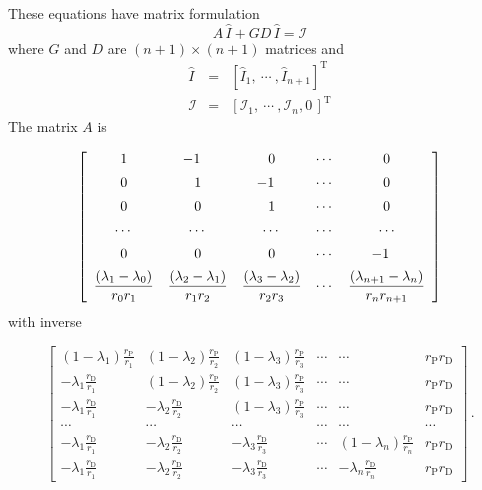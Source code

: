 \documentclass{slides}
\def\ds{\displaystyle}
\begin{document}
%
%
\begin{slide}
These equations have matrix formulation
\[
A\,\widehat{I}+GD\,\widehat{I}=\mathcal{I}
\]
where $G$ and $D$ are $(n+1)\times(n+1)$ matrices and
\[
\begin{array}{rcl}
\widehat{I} & = & [\widehat{I}_1,\ \cdots\ ,
\widehat{I}_{n+1}]^\mathrm{T}\\[10pt]
\mathcal{I} & = & [\mathcal{I}_1,\ \cdots\ ,
\mathcal{I}_n,0\,]^\mathrm{T}
\end{array}
\]
The matrix $A$ is

{
\tiny
\[
\left[\begin{array}{ccccc}
1 & \hskip-9pt-1 &  0 & \cdots & 0 \\[5pt]
0 &  1 & \hskip-9pt-1 & \cdots & 0 \\[5pt]
0 &  0 &  1 & \cdots & 0 \\[5pt]
\cdots & \cdots & \cdots & \cdots & \cdots \\[5pt]
0 & 0 & 0 & \cdots & \hskip-9pt-1 \\[5pt]
\ds\frac{(\lambda_1-\lambda_0)}{r_0 r_1} &
\ds\frac{(\lambda_2-\lambda_1)}{r_1 r_2} &
\ds\frac{(\lambda_3-\lambda_2)}{r_2 r_3} &
\cdots & \ds\frac{(\lambda_{n+1}-\lambda_n)}{r_n r_{n+1}}
\end{array}\right]
\]
}
with inverse

{\tiny
\[
\left[\begin{array}{ccccccc}
(1-\lambda_1)\ds\frac{r_\mathrm{P}}{r_1} & (1-\lambda_2)\ds\frac{r_\mathrm{P}}{r_2} &
(1-\lambda_3)\ds\frac{r_\mathrm{P}}{r_3} &
\cdots & \cdots & r_\mathrm{P}r_\mathrm{D} \\[15pt]
 -\lambda_1\ds\frac{r_\mathrm{D}}{r_1} & (1-\lambda_2)\ds\frac{r_\mathrm{P}}{r_2} &
(1-\lambda_3)\ds\frac{r_\mathrm{P}}{r_3} &
\cdots & \cdots & r_\mathrm{P}r_\mathrm{D} \\[15pt]
 -\lambda_1\ds\frac{r_\mathrm{D}}{r_1} &  -\lambda_2\ds\frac{r_\mathrm{D}}{r_2} &
(1-\lambda_3)\ds\frac{r_\mathrm{P}}{r_3} &
\cdots & \cdots & r_\mathrm{P}r_\mathrm{D} \\[15pt]
\cdots & \cdots & \cdots & \cdots & \cdots & \cdots \\[15pt]
-\lambda_1\ds\frac{r_\mathrm{D}}{r_1} & -\lambda_2\ds\frac{r_\mathrm{D}}{r_2} &
-\lambda_3\ds\frac{r_\mathrm{D}}{r_3} & \cdots &
(1-\lambda_n)\ds\frac{r_\mathrm{P}}{r_n} & r_\mathrm{P}r_\mathrm{D} \\[15pt]
-\lambda_1\ds\frac{r_\mathrm{D}}{r_1} &
-\lambda_2\ds\frac{r_\mathrm{D}}{r_2} &
-\lambda_3\ds\frac{r_\mathrm{D}}{r_3} & \cdots &
-\lambda_n\ds\frac{r_\mathrm{D}}{r_n} & r_\mathrm{P}r_\mathrm{D}
\end{array}\right]\,.
\]
}
\end{slide}
\end{document}
